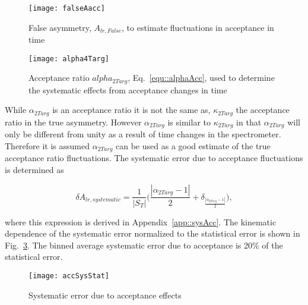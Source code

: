\begin{figure}[h!t]
  \begin{center}
    \texttt{[image: falseAacc]}
    \caption{False asymmetry, $A_{lr,False}$, to estimate fluctuations in
      acceptance in time}
    \label{fig::falseAacc}
  \end{center}
\end{figure}

\begin{figure}[h!t]
  \begin{center}
    \texttt{[image: alpha4Targ]}
    \caption{Acceptance ratio $alpha_{2Targ}$, Eq.~\ref{equ::alphaAcc}, used to
      determine the systematic effects from acceptance changes in time}
    \label{fig::alpha}
  \end{center}
\end{figure}

While $\alpha_{2Targ}$ is an acceptance ratio it is not the same as,
$\kappa_{2Targ}$ the acceptance ratio in the true asymmetry.  However
$\alpha_{2Targ}$ is similar to $\kappa_{2Targ}$ in that $\alpha_{2Targ}$ will
only be different from unity as a result of time changes in the spectrometer.
Therefore it is assumed $\alpha_{2Targ}$ can be used as a good estimate of the
true acceptance ratio fluctuations.  The systematic error due to acceptance
fluctuations is determined as

\begin{equation}
  \delta A_{lr,systematic} =
  \frac{1}{|S_T|}
  \Big(\frac{|\alpha_{2Targ}-1|}{2}
  + \delta_{\frac{|\alpha_{2Targ}-1|}{2}} \Big),
\end{equation}

\noindent
where this expression is derived in Appendix~\ref{app::sysAcc}.  The kinematic
dependence of the systematic error normalized to the statistical error is shown
in Fig.~\ref{fig::accSysStat}.  The binned average systematic error due to
acceptance is 20\% of the statistical error.

\begin{figure}[h!t]
  \begin{center}
    \texttt{[image: accSysStat]}
    \caption{Systematic error due to acceptance effects}
    \label{fig::accSysStat}
  \end{center}
\end{figure}


